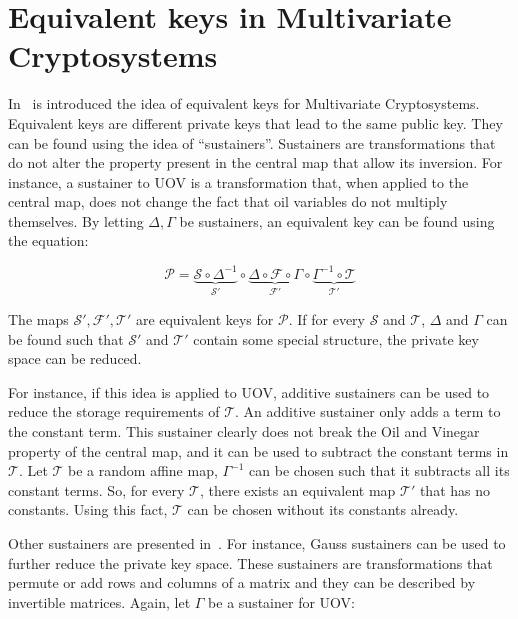 \documentclass{ufsctex/ufsctex}
\begin{document}
\section{Equivalent keys in Multivariate Cryptosystems}
\label{sec:equivalentkeys}

In~\cite{wolf2005equivalent} is introduced the idea of equivalent keys for
Multivariate Cryptosystems. Equivalent keys are different private keys that
lead to the same public key. They can be found using the idea of
``sustainers''. Sustainers are transformations that do not alter the property
present in the central map that allow its inversion. For instance, a sustainer
to UOV is a transformation that, when applied to the central map, does not
change the fact that oil variables do not multiply themselves. By letting
$\Delta, \Gamma$ be sustainers, an equivalent key can be found using the
equation:

\begin{equation}\label{eq:sustainer}
\mathcal{P} =
\underbrace{\mathcal{S} \circ \Delta^{-1}}_{\mathcal{S'}}
\circ
\underbrace{\Delta \circ \mathcal{F} \circ \Gamma}_{\mathcal{F'}}
\circ
\underbrace{\Gamma^{-1} \circ \mathcal{T}}_{\mathcal{T'}}
\end{equation}

The maps $\mathcal{S'}, \mathcal{F'}, \mathcal{T'}$ are equivalent keys for
$\mathcal{P}$. If for every $\mathcal{S}$ and $\mathcal{T}$, $\Delta$ and
$\Gamma$ can be found such that $\mathcal{S'}$ and $\mathcal{T'}$ contain some
special structure, the private key space can be reduced.

For instance, if this idea is applied to UOV, additive sustainers can be used
to reduce the storage requirements of $\mathcal{T}$. An additive sustainer only
adds a term to the constant term. This sustainer clearly does not break the Oil
and Vinegar property of the central map, and it can be used to subtract the
constant terms in $\mathcal{T}$. Let $\mathcal{T}$ be a random affine map,
$\Gamma^{-1}$ can be chosen such that it subtracts all its constant terms. So,
for every $\mathcal{T}$, there exists an equivalent map $\mathcal{T'}$ that has
no constants. Using this fact, $\mathcal{T}$ can be chosen without its
constants already.

Other sustainers are presented in~\cite{wolf2011equivalent}. For instance,
Gauss sustainers can be used to further reduce the private key space. These
sustainers are transformations that permute or add rows and columns of a matrix
and they can be described by invertible matrices. Again, let $\Gamma$ be a
sustainer for UOV:
\end{document}
